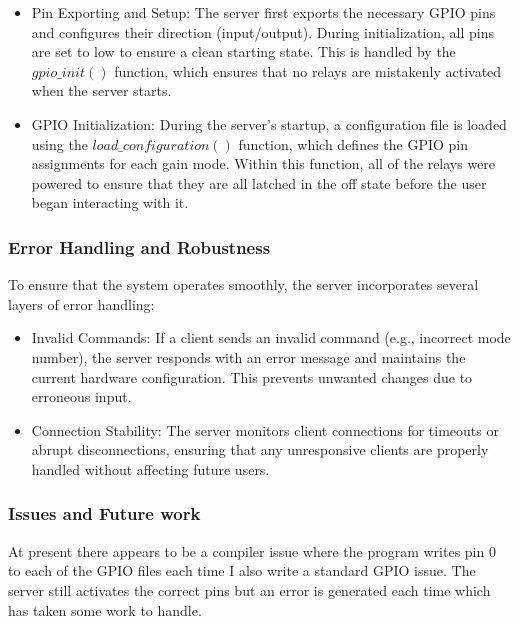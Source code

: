 \documentclass[conference]{IEEEtran}
\begin{document}
\begin{itemize}
    \item Pin Exporting and Setup: The server first exports the necessary GPIO pins and configures their direction (input/output). During initialization, all pins are set to low to ensure a clean starting state. This is handled by the $gpio\_init()$ function, which ensures that no relays are mistakenly activated when the server starts.
    \item GPIO Initialization: During the server’s startup, a configuration file is loaded using the $load\_configuration()$ function, which defines the GPIO pin assignments for each gain mode. Within this function, all of the relays were powered to ensure that they are all latched in the off state before the user began interacting with it.\\
\end{itemize}


\subsubsection{Error Handling and Robustness}

To ensure that the system operates smoothly, the server incorporates several layers of error handling:\\

\begin{itemize}
    \item Invalid Commands: If a client sends an invalid command (e.g., incorrect mode number), the server responds with an error message and maintains the current hardware configuration. This prevents unwanted changes due to erroneous input.
    \item Connection Stability: The server monitors client connections for timeouts or abrupt disconnections, ensuring that any unresponsive clients are properly handled without affecting future users.\\
\end{itemize}


\subsubsection{Issues and Future work}
At present there appears to be a compiler issue where the program writes pin 0 to each of the GPIO files each time I also write a standard GPIO issue. The server still activates the correct pins but an error is generated each time which has taken some work to handle. \\
\end{document}
